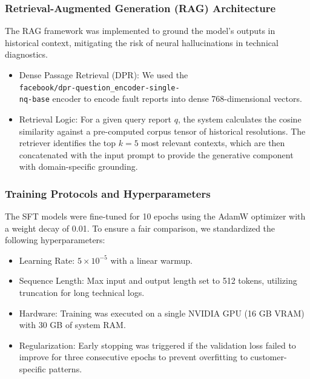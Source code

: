 \documentclass[10pt,twocolumn,journal]{IEEEtran}
\begin{document}
\subsubsection{Retrieval-Augmented Generation (RAG) Architecture}
The RAG framework was implemented to ground the model's outputs in historical context, mitigating the risk of neural hallucinations in technical diagnostics.

\begin{itemize}
    \item Dense Passage Retrieval (DPR): We used the\\
    \texttt{facebook/dpr-question\_encoder-single- \\
    nq-base} encoder to encode fault reports into dense
    768-dimensional vectors. 
    \item Retrieval Logic: For a given query report $q$, the system calculates the cosine similarity against a pre-computed corpus tensor of historical resolutions. The retriever identifies the top $k=5$ most relevant contexts, which are then concatenated with the input prompt to provide the generative component with domain-specific grounding.
\end{itemize}

\subsubsection{Training Protocols and Hyperparameters}
The SFT models were fine-tuned for 10 epochs using the AdamW optimizer with a weight decay of 0.01. To ensure a fair comparison, we standardized the following hyperparameters:
\begin{itemize}
    \item Learning Rate: $5 \times 10^{-5}$ with a linear warmup.
    \item Sequence Length: Max input and output length set to 512 tokens, utilizing truncation for long technical logs.
    \item Hardware: Training was executed on a single NVIDIA GPU (16 GB VRAM) with 30 GB of system RAM.
    \item Regularization: Early stopping was triggered if the validation loss failed to improve for three consecutive epochs to prevent overfitting to customer-specific patterns.
\end{itemize}
\end{document}
